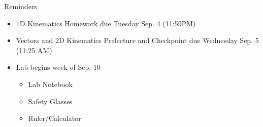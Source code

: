 \documentclass{beamer}
\newenvironment{myproblem}
{
\setbeamercolor{author in head/foot}{bg=black} 		
\setbeamercolor{subsection in head/foot}{bg=myviolet} 	
\setbeamercolor{frametitle}{bg=myviolet}
\setbeamercolor{item projected}{bg=myviolet}	 				
}{
\setbeamercolor{author in head/foot}{bg=black}
\setbeamercolor{subsection in head/foot}{bg=myblue} 
\setbeamercolor{frametitle}{bg=myblue}
\setbeamercolor{item projected}{bg=myblue}	
}
\begin{document}

\begin{frame}{Reminders}
\begin{itemize}
	\item 1D Kinematics Homework due Tuesday Sep. 4 (11:59PM)
	\item Vectors and 2D Kinematics Prelecture and Checkpoint due Wednesday Sep. 5 (11:25 AM)
	\item Lab begins week of Sep. 10 
	\begin{itemize}
		\item Lab Notebook
		\item Safety Glasses
		\item Ruler/Calculator
	\end{itemize}
\end{itemize}
\end{frame}
\end{document}
